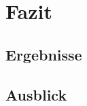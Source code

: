 \chapter{Fazit}
\label{chap:fazit}

\section{Ergebnisse}
\label{sec:ergebnisse}

\section{Ausblick}
\label{sec:ausblick}
